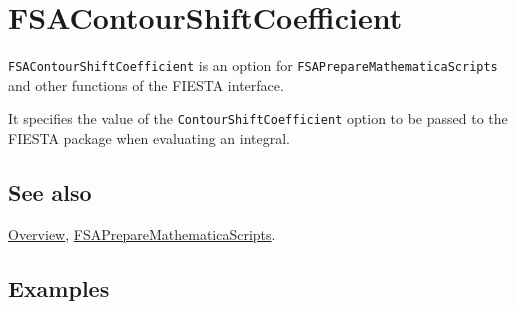 \documentclass[../FeynHelpersManual.tex]{subfiles}
\begin{document}
\begin{Shaded}
\begin{Highlighting}[]
 
\end{Highlighting}
\end{Shaded}

\hypertarget{fsacontourshiftcoefficient}{
\section{FSAContourShiftCoefficient}\label{fsacontourshiftcoefficient}}

\texttt{FSAContourShiftCoefficient} is an option for
\texttt{FSAPrepareMathematicaScripts} and other functions of the FIESTA
interface.

It specifies the value of the \texttt{ContourShiftCoefficient} option to
be passed to the FIESTA package when evaluating an integral.

\subsection{See also}

\hyperlink{toc}{Overview},
\hyperlink{fsapreparemathematicascripts}{FSAPrepareMathematicaScripts}.

\subsection{Examples}
\end{document}
